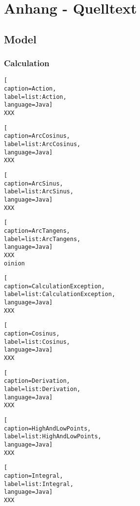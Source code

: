 
\section{Anhang - Quelltext}

\subsection{Model}

\subsubsection{Calculation}

\begin{lstlisting}[
caption=Action,
label=list:Action,
language=Java]
XXX
\end{lstlisting}    

\begin{lstlisting}[
caption=ArcCosinus,
label=list:ArcCosinus,
language=Java]
XXX
\end{lstlisting}    

\begin{lstlisting}[
caption=ArcSinus,
label=list:ArcSinus,
language=Java]
XXX
\end{lstlisting}    

\begin{lstlisting}[
caption=ArcTangens,
label=list:ArcTangens,
language=Java]
XXX
oinion
\end{lstlisting}    

\begin{lstlisting}[
caption=CalculationException,
label=list:CalculationException,
language=Java]
XXX
\end{lstlisting}    

\begin{lstlisting}[
caption=Cosinus,
label=list:Cosinus,
language=Java]
XXX
\end{lstlisting}    

\begin{lstlisting}[
caption=Derivation,
label=list:Derivation,
language=Java]
XXX
\end{lstlisting}    

\begin{lstlisting}[
caption=HighAndLowPoints,
label=list:HighAndLowPoints,
language=Java]
XXX
\end{lstlisting}    

\begin{lstlisting}[
caption=Integral,
label=list:Integral,
language=Java]
XXX
\end{lstlisting}    

